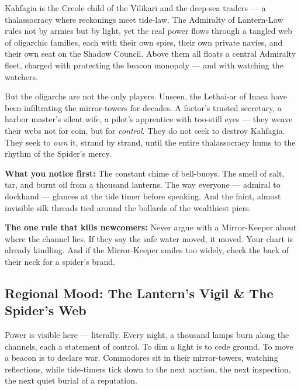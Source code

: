 \vspace{2mm}
\begin{tcolorbox}[colback=black!3,colframe=blue!60!black,title={Theme \& Atmosphere},breakable]
Kahfagia is the Creole child of the Vilikari and the deep-sea traders --- a thalassocracy where reckonings meet tide-law. The Admiralty of Lantern-Law rules not by armies but by light, yet the real power flows through a tangled web of oligarchic families, each with their own spies, their own private navies, and their own seat on the Shadow Council. Above them all floats a central Admiralty fleet, charged with protecting the beacon monopoly --- and with watching the watchers.

But the oligarchs are not the only players. Unseen, the Lethai-ar of Inaea have been infiltrating the mirror-towers for decades. A factor's trusted secretary, a harbor master's silent wife, a pilot's apprentice with too-still eyes --- they weave their webs not for coin, but for \emph{control}. They do not seek to destroy Kahfagia. They seek to \emph{own} it, strand by strand, until the entire thalassocracy hums to the rhythm of the Spider's mercy.

\textbf{What you notice first:} The constant chime of bell-buoys. The smell of salt, tar, and burnt oil from a thousand lanterns. The way everyone --- admiral to dockhand --- glances at the tide timer before speaking. And the faint, almost invisible silk threads tied around the bollards of the wealthiest piers.

\textbf{The one rule that kills newcomers:} Never argue with a Mirror-Keeper about where the channel lies. If they say the safe water moved, it moved. Your chart is already kindling. And if the Mirror-Keeper smiles too widely, check the back of their neck for a spider's brand.
\end{tcolorbox}

\subsection*{Regional Mood: The Lantern's Vigil \& The Spider's Web}

Power is visible here --- literally. Every night, a thousand lamps burn along the channels, each a statement of control. To dim a light is to cede ground. To move a beacon is to declare war. Commodores sit in their mirror-towers, watching reflections, while tide-timers tick down to the next auction, the next inspection, the next quiet burial of a reputation.


